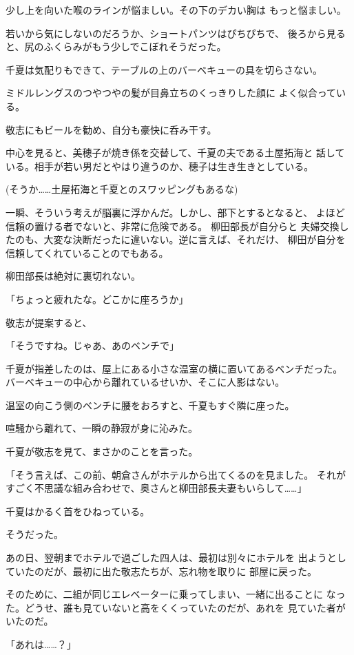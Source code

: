 ﻿\documentclass[
    book,tate,
    line_length=30zw,
    jafontsize=12pt,
    paper=b5j,
    landscape,
    ]{jlreq}
\begin{document}
少し上を向いた喉のラインが悩ましい。その下のデカい胸は
もっと悩ましい。

若いから気にしないのだろうか、ショートパンツはぴちぴちで、
後ろから見ると、尻のふくらみがもう少しでこぼれそうだった。

千夏は気配りもできて、テーブルの上のバーベキューの具を切らさない。

ミドルレングスのつやつやの髪が目鼻立ちのくっきりした顔に
よく似合っている。

敬志にもビールを勧め、自分も豪快に呑み干す。

中心を見ると、美穂子が焼き係を交替して、千夏の夫である土屋拓海と
話している。相手が若い男だとやはり違うのか、穂子は生き生きとしている。

(そうか……土屋拓海と千夏とのスワッピングもあるな)

一瞬、そういう考えが脳裏に浮かんだ。しかし、部下とするとなると、
よほど信頼の置ける者でないと、非常に危険である。 柳田部長が自分らと
夫婦交換したのも、大変な決断だったに違いない。逆に言えば、それだけ、
柳田が自分を信頼してくれていることのでもある。

柳田部長は絶対に裏切れない。

「ちょっと疲れたな。どこかに座ろうか」

敬志が提案すると、

「そうですね。じゃあ、あのベンチで」

千夏が指差したのは、屋上にある小さな温室の横に置いてあるベンチだった。
バーベキューの中心から離れているせいか、そこに人影はない。

温室の向こう側のベンチに腰をおろすと、千夏もすぐ隣に座った。

喧騒から離れて、一瞬の静寂が身に沁みた。

千夏が敬志を見て、まさかのことを言った。

「そう言えば、この前、朝倉さんがホテルから出てくるのを見ました。
それがすごく不思議な組み合わせで、奥さんと柳田部長夫妻もいらして……」

千夏はかるく首をひねっている。

そうだった。

あの日、翌朝までホテルで過ごした四人は、最初は別々にホテルを
出ようとしていたのだが、最初に出た敬志たちが、忘れ物を取りに
部屋に戻った。

そのために、二組が同じエレベーターに乗ってしまい、一緒に出ることに
なった。どうせ、誰も見ていないと高をくくっていたのだが、あれを
見ていた者がいたのだ。

「あれは……？」
\end{document}
